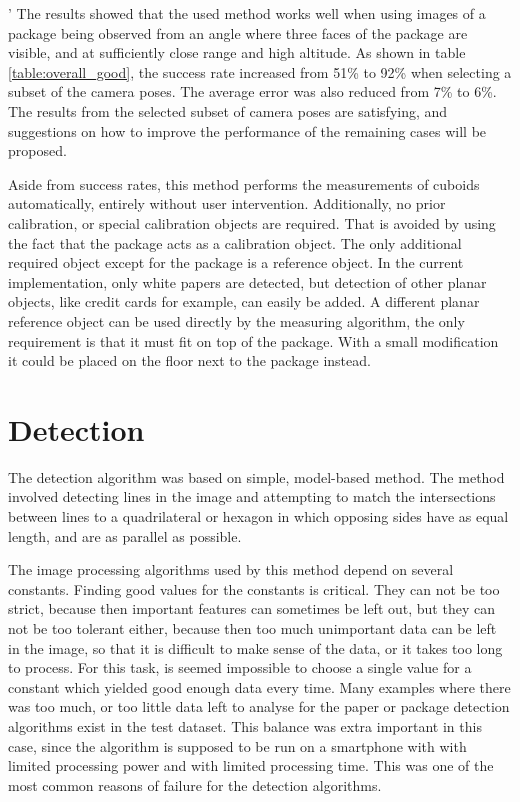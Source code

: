 '
The results showed that the used method works well when using images of a package being observed from an angle where three faces of the package are visible, and at sufficiently close range and high altitude. 
As shown in table \ref{table:overall_good}, the success rate increased from 51\% to 92\% when selecting a subset of the camera poses.
The average error was also reduced from 7\% to 6\%.
The results from the selected subset of camera poses are satisfying, and suggestions on how to improve the performance of the remaining cases will be proposed.

Aside from success rates, this method performs the measurements of cuboids automatically, entirely without user intervention.
Additionally, no prior calibration, or special calibration objects are required.
That is avoided by using the fact that the package acts as a calibration object.
The only additional required object except for the package is a reference object.
In the current implementation, only white papers are detected, but detection of other planar objects, like credit cards for example, can easily be added.
A different planar reference object can be used directly by the measuring algorithm, the only requirement is that it must fit on top of the package.
With a small modification it could be placed on the floor next to the package instead.

\section{Detection} \label{discussion:detection}
The detection algorithm was based on simple, model-based method. 
The method involved detecting lines in the image and attempting to match the intersections between lines to a quadrilateral or hexagon in which opposing sides have as equal length, and are as parallel as possible.

The image processing algorithms used by this method depend on several constants.
Finding good values for the constants is critical.
They can not be too strict, because then important features can sometimes be left out, but they can not be too tolerant either, because then too much unimportant data can be left in the image, so that it is difficult to make sense of the data, or it takes too long to process.
For this task, is seemed impossible to choose a single value for a constant which yielded good enough data every time.
Many examples where there was too much, or too little data left to analyse for the paper or package detection algorithms exist in the test dataset.
This balance was extra important in this case, since the algorithm is supposed to be run on a smartphone with with limited processing power and with limited processing time.
This was one of the most common reasons of failure for the detection algorithms.


